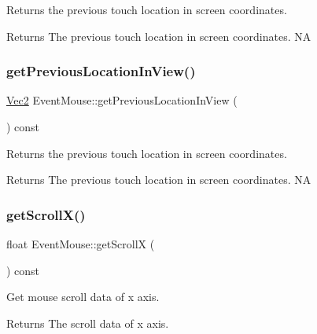 Returns the previous touch location in screen coordinates.

\begin{DoxyReturn}{Returns}
The previous touch location in screen coordinates.  NA 
\end{DoxyReturn}
\mbox{\label{classEventMouse_af6c5fce01a5275995b993bd4f315ab60}} 
\subsubsection{\texorpdfstring{get\+Previous\+Location\+In\+View()}{getPreviousLocationInView()}\hspace{0.1cm}{\footnotesize\ttfamily [2/2]}}
{\footnotesize\ttfamily \hyperlink{classVec2}{Vec2} Event\+Mouse\+::get\+Previous\+Location\+In\+View (\begin{DoxyParamCaption}{ }\end{DoxyParamCaption}) const}

Returns the previous touch location in screen coordinates.

\begin{DoxyReturn}{Returns}
The previous touch location in screen coordinates.  NA 
\end{DoxyReturn}
\mbox{\label{classEventMouse_a6bca76b62d710a7eadfea9d38ef83597}} 
\subsubsection{\texorpdfstring{get\+Scroll\+X()}{getScrollX()}\hspace{0.1cm}{\footnotesize\ttfamily [1/2]}}
{\footnotesize\ttfamily float Event\+Mouse\+::get\+ScrollX (\begin{DoxyParamCaption}{ }\end{DoxyParamCaption}) const\hspace{0.3cm}{\ttfamily [inline]}}

Get mouse scroll data of x axis.

\begin{DoxyReturn}{Returns}
The scroll data of x axis. 
\end{DoxyReturn}
\mbox{\label{classEventMouse_a6bca76b62d710a7eadfea9d38ef83597}} 
